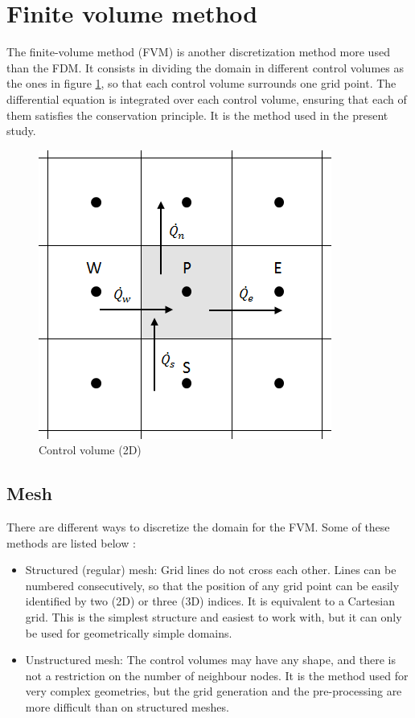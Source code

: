 \section{Finite volume method}
The finite-volume method (FVM) is another discretization method more used than the FDM. It consists in dividing the domain in different control volumes as the ones in figure \ref{controlvolume2d}, so that each control volume surrounds one grid point. The differential equation is integrated over each control volume, ensuring that each of them satisfies the conservation principle. It is the method used in the present study.
\begin{figure}[h!]
	\centering
	\includegraphics[scale=0.5]{StateArt/controlvolume2d}
	\caption{Control volume (2D)}
	\label{controlvolume2d}
\end{figure}

\subsection{Mesh}
There are different ways to discretize the domain for the FVM. Some of these methods are listed below \cite{Ferziger2002}:
\begin{itemize}
	\item Structured (regular) mesh: Grid lines do not cross each other. Lines can be numbered consecutively, so that the position of any grid point can be easily identified by two (2D) or three (3D) indices. It is equivalent to a Cartesian grid. This is the simplest structure and easiest to work with, but it can only be used for geometrically simple domains.
	\item Unstructured mesh: The control volumes may have any shape, and there is not a restriction on the number of neighbour nodes. It is the method used for very complex geometries, but the grid generation and the pre-processing are more difficult than on structured meshes.
\end{itemize}

